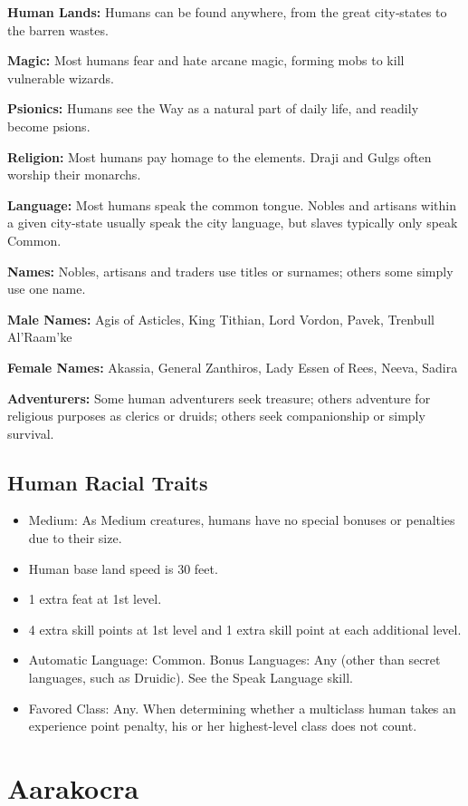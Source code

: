 \documentclass[10pt,a4paper,twocolumn]{d20}
\begin{document}
\textbf{Human Lands:} Humans can be found anywhere, from the great city‐states to the barren wastes.

\textbf{Magic:} Most humans fear and hate arcane magic, forming mobs to kill vulnerable wizards.

\textbf{Psionics:} Humans see the Way as a natural part of daily life, and readily become psions.

\textbf{Religion:} Most humans pay homage to the elements. Draji and Gulgs often worship their monarchs.

\textbf{Language:} Most humans speak the common tongue. Nobles and artisans within a given city‐state usually speak the city language, but slaves typically only speak Common.

\textbf{Names:} Nobles, artisans and traders use titles or surnames; others some simply use one name.

\textbf{Male Names:} Agis of Asticles, King Tithian, Lord Vordon, Pavek, Trenbull Al’Raam’ke

\textbf{Female Names:} Akassia, General Zanthiros, Lady Essen of Rees, Neeva, Sadira

\textbf{Adventurers:} Some human adventurers seek treasure; others adventure for religious purposes as clerics or druids; others seek companionship or simply survival.

\subsection{Human Racial Traits}
\begin{itemize}
  \item Medium: As Medium creatures, humans have no special bonuses or penalties due to their size. 
  \item Human base land speed is 30 feet.
  \item 1 extra feat at 1st level.
  \item 4 extra skill points at 1st level and 1 extra skill point at each additional level.
  \item Automatic Language: Common. Bonus Languages: Any (other than secret languages, such as Druidic). See the Speak Language skill.
  \item Favored Class: Any. When determining whether a multiclass human takes an experience point penalty, his or her highest-level class does not count.
\end{itemize}

\section{Aarakocra}
\end{document}
